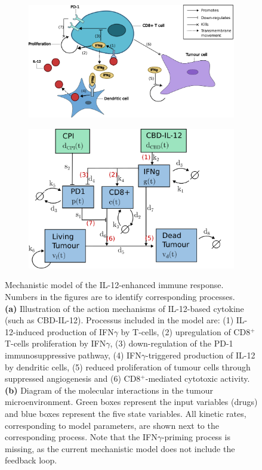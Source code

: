 \documentclass[11pt]{article}
\begin{document}
\begin{figure}[!ht]
    \centering
    \begin{subfigure}{.49\textwidth}
        \centering\includegraphics[scale=0.3]{finalBM.png}
        \caption{}        
    \end{subfigure}
    \begin{subfigure}{.49\textwidth}
        \centering\includegraphics[scale=0.3]{finalCP.png}    
        \caption{}
    \end{subfigure}
    \caption{Mechanistic model of the IL-12-enhanced immune response. Numbers in the figures are to identify corresponding processes. \\
    \textbf{(a)} Illustration of the action mechanisms of IL-12-based cytokine (such as CBD-IL-12). Processus included in the model are: (1) IL-12-induced production of IFN$\gamma$ by T-cells, (2) upregulation of CD8$^+$ T-cells proliferation by IFN$\gamma$, (3) down-regulation of the PD-1 immunosuppressive pathway, (4) IFN$\gamma$-triggered production of IL-12 by dendritic cells, (5) reduced proliferation of tumour cells through suppressed angiogenesis and (6) CD8$^+$-mediated cytotoxic activity.\\
    \textbf{(b)} Diagram of the molecular interactions in the tumour microenvironment. Green boxes represent the input variables (drugs) and blue boxes represent the five state variables. All kinetic rates, corresponding to model parameters, are shown next to the corresponding process. Note that the IFN$\gamma$-priming process is missing, as the current mechanistic model does not include the feedback loop.}
    \label{fig:mech}
\end{figure}
\end{document}
